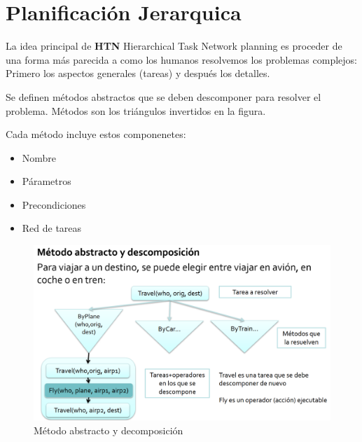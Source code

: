 \section{Planificación Jerarquica}


La idea principal de \textbf{HTN} Hierarchical Task Network planning es proceder de una forma más parecida
a como los humanos resolvemos los problemas complejos:
Primero los aspectos generales (tareas) y después los detalles.


\begin{paracol}{2}
   
   \colfill
   Se definen métodos abstractos que se deben descomponer
   para resolver el problema.
   Métodos son los triángulos invertidos en la figura.

   Cada método incluye estos componenetes:
   \begin{itemize}
      \item Nombre
      \item Párametros
      \item Precondiciones
      \item Red de tareas
   \end{itemize}
   \colfill
   \switchcolumn

   \begin{figure}[htbp]
      \centering
      \includegraphics[width=\columnwidth]{images/02/htn.png}
      \caption{Método abstracto y decomposición}
      \label{fig:02/htn}
   \end{figure}
\end{paracol}


